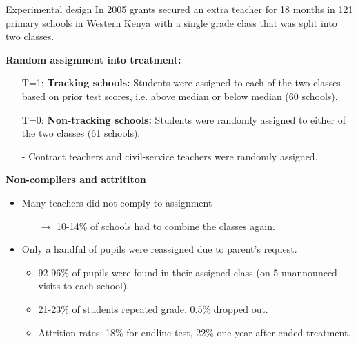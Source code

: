 \documentclass[9pt]{beamer}
\newcommand{\comment}[1]{}  %
\numberwithin{equation}{section}
\begin{document}
\begin{frame}{Experimental design}
  In 2005 grants secured an extra teacher for 18 months in 121 primary schools in Western Kenya with a single  grade class that was split into two classes.
  \comment{140 schools, but 19 are excluded from analysis due to having more than 1 first-grade class $\rightarrow$ Sampling bias: Only smaller schools (one \nth{1} grade).}

  \textbf{Random assignment into treatment:}
    \begin{itemize}
      \item[T=1:] \textbf{Tracking schools:} Students were assigned to each of the two classes based on prior test scores, i.e. above median or below median (60 schools).
      \item[T=0:] \textbf{Non-tracking schools:} Students were randomly assigned to either of the two classes (61 schools).
      \item[-] Contract teachers and civil-service teachers were randomly assigned.
    \end{itemize}
  \textbf{Non-compliers and attrititon}
    \begin{itemize}
      \item Many teachers did not comply to assignment
      \begin{itemize}
        \item[$\rightarrow$] 10-14\% of schools had to combine the classes again.
      \end{itemize}
      \item Only a handful of pupils were reassigned due to parent's request.
      \begin{itemize}
        \item 92-96\% of pupils were found in their assigned class (on 5 unannounced visits to each school).
        \comment{Regardless, the analysis is based on the initial assignment.}
        \item 21-23\% of students repeated  grade. 0.5\% dropped out.
        \item Attrition rates: 18\% for endline test, 22\% one year after ended treatment.
      \end{itemize}
    \end{itemize}
\end{frame}
\end{document}
